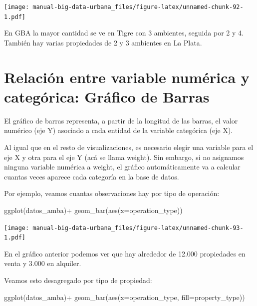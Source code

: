 \documentclass[
  spanish,
]{book}
\newenvironment{Shaded}{\begin{snugshade}}{\end{snugshade}}
\newcommand{\AttributeTok}[1]{\textcolor[rgb]{0.77,0.63,0.00}{#1}}
\newcommand{\FunctionTok}[1]{\textcolor[rgb]{0.00,0.00,0.00}{#1}}
\newcommand{\NormalTok}[1]{#1}
\newcommand{\SpecialCharTok}[1]{\textcolor[rgb]{0.00,0.00,0.00}{#1}}
\begin{document}
\texttt{[image: manual-big-data-urbana\_files/figure-latex/unnamed-chunk-92-1.pdf]}

En GBA la mayor cantidad se ve en Tigre con 3 ambientes, seguida por 2 y 4. También hay varias propiedades de 2 y 3 ambientes en La Plata.

\hypertarget{relaciuxf3n-entre-variable-numuxe9rica-y-categuxf3rica-gruxe1fico-de-barras}{%
\section{Relación entre variable numérica y categórica: Gráfico de Barras}\label{relaciuxf3n-entre-variable-numuxe9rica-y-categuxf3rica-gruxe1fico-de-barras}}

El gráfico de barras representa, a partir de la longitud de las barras, el valor numérico (eje Y) asociado a cada entidad de la variable categórica (eje X).

Al igual que en el resto de visualizaciones, es necesario elegir una variable para el eje X y otra para el eje Y (acá se llama weight). Sin embargo, si no asignamos ninguna variable numérica a weight, el gráfico automáticamente va a calcular cuantas veces aparece cada categoría en la base de datos.

Por ejemplo, veamos cuantas observaciones hay por tipo de operación:

\begin{Shaded}
\begin{Highlighting}[]
\FunctionTok{ggplot}\NormalTok{(datos\_amba)}\SpecialCharTok{+}
  \FunctionTok{geom\_bar}\NormalTok{(}\FunctionTok{aes}\NormalTok{(}\AttributeTok{x=}\NormalTok{operation\_type))}
\end{Highlighting}
\end{Shaded}

\texttt{[image: manual-big-data-urbana\_files/figure-latex/unnamed-chunk-93-1.pdf]}

En el gráfico anterior podemos ver que hay alrededor de 12.000 propiedades en venta y 3.000 en alquiler.

Veamos esto desagregado por tipo de propiedad:

\begin{Shaded}
\begin{Highlighting}[]
\FunctionTok{ggplot}\NormalTok{(datos\_amba)}\SpecialCharTok{+}
  \FunctionTok{geom\_bar}\NormalTok{(}\FunctionTok{aes}\NormalTok{(}\AttributeTok{x=}\NormalTok{operation\_type, }\AttributeTok{fill=}\NormalTok{property\_type))}
\end{Highlighting}
\end{Shaded}
\end{document}
